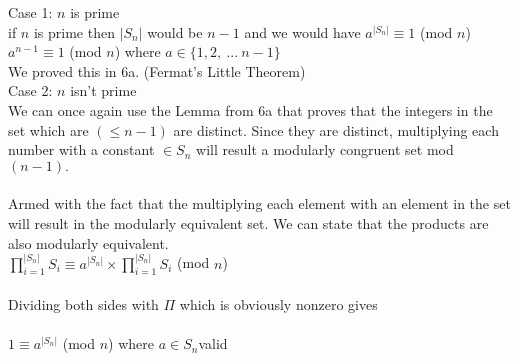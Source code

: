 \documentclass[11pt,letterpaper]{article}
\begin{document}
\begin{enumerate}[(a)]
Case 1: $n$ is prime\\

if $n$ is prime then $|S_n|$ would be $n-1$ and we would have $a^{|S_n|}\equiv 1$ (mod $n$)\\
$a^{n-1}\equiv 1$ (mod $n$) where $a\in\{1,2,~...~n-1\}$\\ 
We proved this in 6a. (Fermat's Little Theorem)\\

Case 2: $n$ isn't prime\\

We can once again use the Lemma from 6a that proves that the integers in the set which are $(\leq n-1)$ are distinct. Since they are distinct, multiplying each number with a constant $\in S_n$ will result a modularly congruent set mod $(n-1).$\\
\\
Armed with the fact that the multiplying each element with an element in the set will result in the modularly equivalent set. We can state that the products are also modularly equivalent.\\

$\prod\limits_{i=1}^{|S_n|}S_i\equiv a^{|S_n|}\times\prod\limits_{i=1}^{|S_n|}S_i$ (mod $n$)\\\\
Dividing both sides with $\Pi$ which is obviously nonzero gives\\ \\
$1 \equiv a^{|S_n|}$ (mod $n$) where $a\in S_n$\hfill valid\\\\
\clearpage

\end{enumerate}
\end{document}
